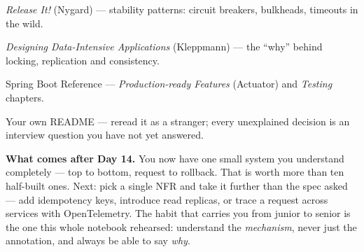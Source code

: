 \begin{wbitem}
  \item \emph{Release It!} (Nygard) --- stability patterns: circuit breakers, bulkheads, timeouts in the wild.
  \item \emph{Designing Data-Intensive Applications} (Kleppmann) --- the ``why'' behind locking, replication and consistency.
  \item Spring Boot Reference --- \emph{Production-ready Features} (Actuator) and \emph{Testing} chapters.
  \item Your own README --- reread it as a stranger; every unexplained decision is an interview question you have not yet answered.
\end{wbitem}

\begin{keyidea}
\textbf{What comes after Day 14.} You now have one small system you understand completely --- top to bottom, request to rollback. That is worth more than ten half-built ones. Next: pick a single NFR and take it further than the spec asked --- add idempotency keys, introduce read replicas, or trace a request across services with OpenTelemetry. The habit that carries you from junior to senior is the one this whole notebook rehearsed: understand the \emph{mechanism}, never just the annotation, and always be able to say \emph{why}.
\end{keyidea}

